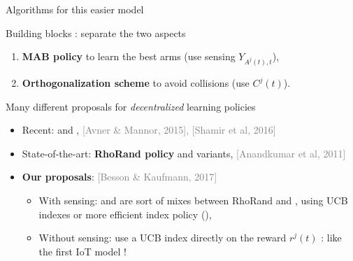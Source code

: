 \documentclass[12pt,english,ignorenonframetext,aspectratio=169,]{beamer}
\providecommand{\tightlist}{%
  \setlength{\itemsep}{0pt}\setlength{\parskip}{0pt}}
\begin{document}
\begin{frame}{Algorithms for this easier model}

\begin{block}{Building blocks : separate the two aspects}

\begin{enumerate}
\def\labelenumi{\arabic{enumi}.}
\tightlist
\item
  \textbf{MAB policy} to learn the best arms (use sensing
  \(Y_{A^j(t),t}\)),
\item
  \textbf{Orthogonalization scheme} to avoid collisions (use
  \(C^j(t)\)).
\end{enumerate}

\pause

\end{block}

\begin{block}{Many different proposals for \emph{decentralized} learning
policies}

\begin{itemize}
\tightlist
\item
  Recent: \MEGA{} and \MusicalChair{},
  \hfill{}{\tiny \textcolor{gray}{[Avner \& Mannor, 2015], [Shamir et al, 2016]}}
\item
  State-of-the-art: \textbf{RhoRand policy} and variants,
  \hfill{}{\tiny \textcolor{gray}{[Anandkumar et al, 2011]}}
\item
  \textbf{Our proposals}:
  \hfill{}{\tiny \textcolor{gray}{[Besson \& Kaufmann, 2017]}}

  \begin{itemize}
  \tightlist
  \item
    With sensing: \RandTopM{} and \MCTopM{} are sort of mixes between
    RhoRand and \MusicalChair{}, using UCB indexes or more efficient
    index policy (\klUCB),
  \item
    Without sensing: \Selfish{} use a UCB index directly on the reward
    \(r^j(t)\) : like the first IoT model !
  \end{itemize}
\end{itemize}

\end{block}

\end{frame}
\end{document}
